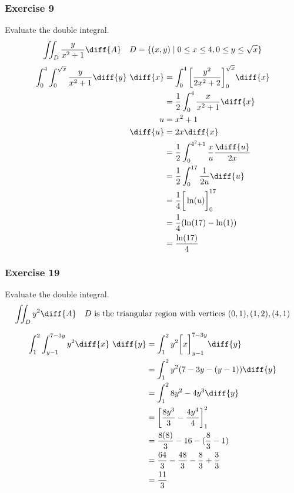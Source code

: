 \documentclass[letterpaper, 12pt]{math}
\begin{document}
\subsubsection*{Exercise 9}
Evaluate the double integral.
\[ \iint_{D}\frac{y}{x^2+1}\diff{A} \quad
    D = \{(x,y)\mid0\le x\le4,0\le y\le\sqrt{x}\} \]
\begin{align*}
  \int_{0}^{4}\int_{0}^{\sqrt{x}}\frac{y}{x^2+1}\diff{y}~\diff{x}
    &= \int_{0}^{4}\bigg[\frac{y^2}{2x^2+2}\bigg]_{0}^{\sqrt{x}}\diff{x} \\
  &= \frac{1}{2}\int_{0}^{4}\frac{x}{x^2+1}\diff{x} \\
  u &= x^2+1 \\
  \diff{u} &= 2x\diff{x} \\
  &= \frac{1}{2}\int_{0}^{4^2+1}\frac{x}{u}\frac{\diff{u}}{2x} \\
  &= \frac{1}{2}\int_{0}^{17}\frac{1}{2u}\diff{u} \\
  &= \frac{1}{4}\bigg[\ln(u)\bigg]_0^{17} \\
  &= \frac{1}{4}(\ln(17)-\ln(1)) \\
  &= \frac{\ln(17)}{4}
\end{align*}

\subsubsection*{Exercise 19}
Evaluate the double integral.
\[ \iint_{D}y^2\diff{A} \quad D \text{ is the triangular region with vertices }
  (0,1), (1,2), (4,1) \]
\begin{center}
\end{center}
\begin{align*}
  \int_{1}^{2}\int_{y-1}^{7-3y}y^2\diff{x}~\diff{y} &=
    \int_{1}^{2}y^2\bigg[x\bigg]_{y-1}^{7-3y}\diff{y} \\
  &= \int_{1}^{2}y^2(7-3y-(y-1))\diff{y} \\
  &= \int_{1}^{2}8y^2-4y^3\diff{y} \\
  &= \bigg[\frac{8y^3}{3}-\frac{4y^4}{4}\bigg]_{1}^{2} \\
  &= \frac{8(8)}{3}-16-(\frac{8}{3}-1) \\
  &= \frac{64}{3}-\frac{48}{3}-\frac{8}{3}+\frac{3}{3} \\
  &= \frac{11}{3}
\end{align*}
\end{document}
